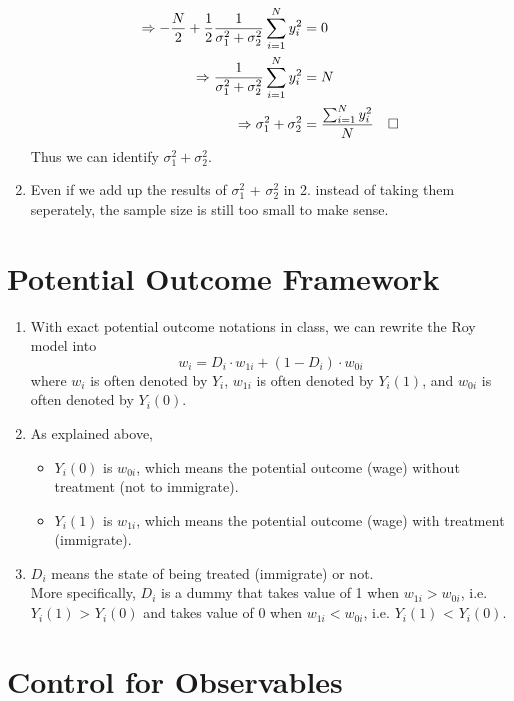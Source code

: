 \documentclass[12pt]{article}
\newcommand*{\QEDA}{\null\nobreak\hfill\ensuremath{\square}}%
\begin{document}
\begin{enumerate}
\begin{align}
                  \Rightarrow -\frac{N}{2} + \frac{1}{2} \frac{1}{\sigma^2_1 + \sigma^2_2} \sum_{i = 1}^{N}y_i^2 & = 0 & \nonumber \\ 
                  \Rightarrow \frac{1}{\sigma^2_1 + \sigma^2_2} \sum_{i = 1}^{N}y_i^2 & = N & \nonumber \\ 
                  \Rightarrow \sigma^2_1 + \sigma^2_2 & = \frac{\sum_{i = 1}^{N}y_i^2}{N} & \nonumber \QEDA
            \end{align}
            Thus we can identify $\sigma^2_1 + \sigma^2_2$.
      \item Even if we add up the results of $\sigma^2_1$ + $\sigma^2_2$ in 2. instead of taking them seperately, the sample size is still too small to make sense.
\end{enumerate}

\section{Potential Outcome Framework} \label{POF}
\begin{enumerate}
      \item With exact potential outcome notations in class, we can rewrite the Roy model into 
            $$w_i = D_i \cdot w_{1i} + (1 - D_i) \cdot w_{0i}$$
            where $w_i$ is often denoted by $Y_i$, $w_{1i}$ is often denoted by $Y_i(1)$, and $w_{0i}$ is often denoted by $Y_i(0)$.
      \item As explained above, 
      \begin{itemize}
            \item $Y_i(0)$ is $w_{0i}$, which means the potential outcome (wage) without treatment (not to immigrate).
            \item $Y_i(1)$ is $w_{1i}$, which means the potential outcome (wage) with treatment (immigrate).
      \end{itemize}
      \item $D_i$ means the state of being treated (immigrate) or not. \\ 
            More specifically, $D_i$ is a dummy that takes value of 1 when $w_{1i} > w_{0i}$, i.e. $Y_i(1)$ > $Y_i(0)$ 
            and takes value of 0 when $w_{1i} < w_{0i}$, i.e. $Y_i(1)$ < $Y_i(0)$.
\end{enumerate}

\section{Control for Observables} \label{control}
\end{document}
